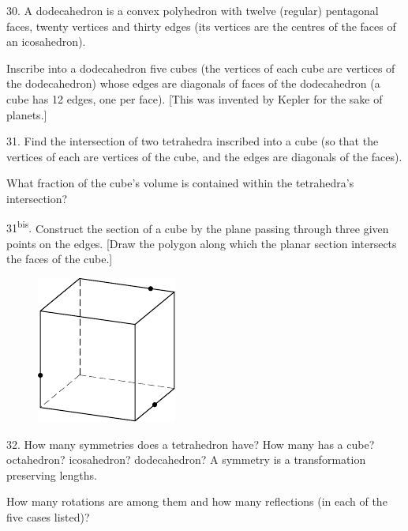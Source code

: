 \begin{problem}{30.}
	A dodecahedron is a convex polyhedron with twelve (regular) pentagonal
	faces, twenty vertices
	and thirty edges (its vertices are the centres of the faces of an icosahedron).

	Inscribe into a dodecahedron five cubes (the vertices of each cube are vertices of the dodecahedron)
	whose edges are diagonals of faces of the dodecahedron (a cube has 12 edges, one per face).
	[This was invented by Kepler for the sake of planets.] 
\end{problem}

\begin{problem}{31.}
	Find the intersection of two tetrahedra inscribed into a cube (so that the vertices of each are
	vertices of the cube, and the edges are diagonals of the faces). 

	What fraction of the cube's volume is contained within the tetrahedra's intersection?
\end{problem}

\begin{problem}{31\textsuperscript{bis}.}
	Construct the section of a cube by the plane passing through three given points on the edges.
	[Draw the polygon along which the planar section intersects the faces of the cube.]
	\begin{figure}[h]
	\centering
	 \includegraphics{taskbook-15}
	\end{figure}
\end{problem}

\begin{problem}{32.}
	How many symmetries does a tetrahedron have? How many has a cube? octahedron? icosahedron?
	dodecahedron? A symmetry is a transformation preserving lengths.

	How many rotations are among them and how many reflections (in each of the five cases listed)?
\end{problem}

